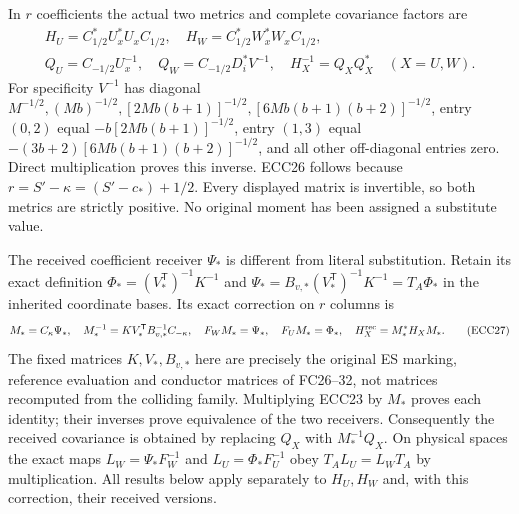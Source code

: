 \documentclass[11pt]{article}
\begin{document}
In $r$ coefficients the actual two metrics and complete covariance
factors are
\begin{equation}
 \begin{gathered}
 H_U=C_{1/2}^*U_x^*U_xC_{1/2},\quad
 H_W=C_{1/2}^*W_x^*W_xC_{1/2},\\
 Q_U=C_{-1/2}U_x^{-1},\quad Q_W=C_{-1/2}D_i^*V^{-1},\quad
 H_X^{-1}=Q_XQ_X^*\quad(X=U,W).
 \end{gathered}\tag{ECC26}
\end{equation}
For specificity $V^{-1}$ has diagonal
$M^{-1/2},(Mb)^{-1/2},[2Mb(b+1)]^{-1/2},[6Mb(b+1)(b+2)]^{-1/2}$,
entry $(0,2)$ equal $-b[2Mb(b+1)]^{-1/2}$, entry $(1,3)$ equal
$-(3b+2)[6Mb(b+1)(b+2)]^{-1/2}$, and all other off-diagonal entries zero.
Direct multiplication proves this inverse. ECC26 follows because
$r=S'-\kappa=(S'-c_*)+1/2$. Every displayed matrix is invertible, so
both metrics are strictly positive. No original moment has been assigned
a substitute value.

The received coefficient receiver $\Psi_*$ is different from literal
substitution. Retain its exact definition
$\Phi_*=(V_*^{\mathsf T})^{-1}K^{-1}$ and
$\Psi_*=B_{v,*}(V_*^{\mathsf T})^{-1}K^{-1}=T_A\Phi_*$ in the inherited
coordinate bases. Its exact correction on $r$ columns is
\begin{equation}
 M_* = C_\kappa\Psi_*,\quad
 M_*^{-1}=K V_*^{\mathsf T} B_{v,*}^{-1}C_{-\kappa},\quad
 F_WM_* = \Psi_*,\quad F_UM_* = \Phi_*,\quad
 H_X^{\rm rec}=M_*^*H_XM_*.
 \tag{ECC27}
\end{equation}
The fixed matrices $K,V_*,B_{v,*}$ here are precisely the original
ES marking, reference evaluation and conductor matrices of FC26--32,
not matrices recomputed from the colliding family. Multiplying ECC23
by $M_*$ proves each identity; their inverses prove equivalence of the
two receivers. Consequently the received covariance is obtained by
replacing $Q_X$ with $M_*^{-1}Q_X$. On physical spaces the exact maps
$L_W=\Psi_*F_W^{-1}$ and $L_U=\Phi_*F_U^{-1}$ obey
$T_AL_U=L_WT_A$ by multiplication. All results below apply separately
to $H_U,H_W$ and, with this correction, their received versions.
\end{document}
